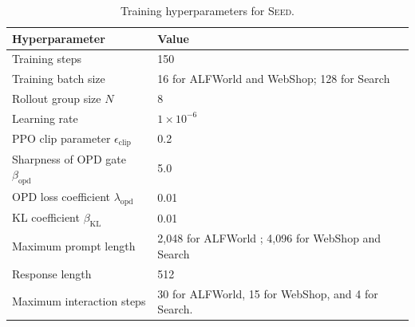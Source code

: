 \begin{table}[t]
\centering
\small
\setlength{\tabcolsep}{6pt}
\renewcommand{\arraystretch}{1.15}
\caption{Training hyperparameters for \textsc{Seed}.}
\label{tab:rl_hyperparameters}
\vspace{0.1in}
\begin{tabular}{@{}p{}p{}@{}}
\toprule
\textbf{Hyperparameter} & \textbf{Value} \\
\midrule

Training steps
& 150  \\

Training batch size
& 16 for ALFWorld and WebShop; 128 for Search \\

Rollout group size $N$
& 8 \\

Learning rate
& $1\times10^{-6}$  \\

PPO clip parameter $\epsilon_\mathrm{clip}$
& 0.2 \\

Sharpness of OPD gate $\beta_\mathrm{opd}$
& 5.0 \\
 
OPD loss coefficient $\lambda_{\mathrm{opd}}$
& 0.01 \\

KL coefficient $\beta_{\mathrm{KL}}$
& 0.01 \\

Maximum prompt length
& 2,048 for ALFWorld ; 4,096 for WebShop and Search  \\

Response length
& 512 \\

Maximum interaction steps
& 30 for ALFWorld, 15 for WebShop, and 4 for Search. \\
\bottomrule
\end{tabular}
\end{table}
